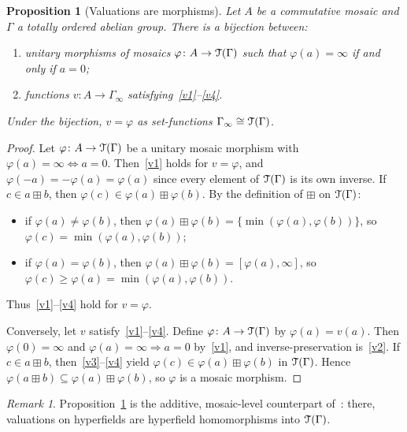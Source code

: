 \documentclass[11pt]{amsart}
\theoremstyle{plain}
\newtheorem{proposition}[theorem]{Proposition}
\theoremstyle{definition}
\theoremstyle{remark}
\newtheorem{remark}[theorem]{Remark}
\newcommand{\T}{\EuScript{T}}
\begin{document}
\begin{proposition}[Valuations are morphisms]
\label{prop:val-as-hom}
Let \(A\) be a commutative mosaic and \(\Gamma\) a totally ordered abelian group. There is a bijection between:
\begin{enumerate}[label=(\alph*)]
\item unitary morphisms of mosaics \(\varphi\colon A\to\T(\Gamma)\) such that \(\varphi(a)=\infty\) if and only if \(a=0\);
\item functions \(v\colon A\to\Gamma_\infty\) satisfying~\eqref{v1}--\eqref{v4}.
\end{enumerate}
Under the bijection, \(v=\varphi\) as set-functions \(\Gamma_\infty\cong\T(\Gamma)\).
\end{proposition}

\begin{proof}
Let \(\varphi\colon A\to\T(\Gamma)\) be a unitary mosaic morphism with \(\varphi(a)=\infty\Leftrightarrow a=0\). Then~\eqref{v1} holds for \(v=\varphi\), and \(\varphi(-a)=-\varphi(a)=\varphi(a)\) since every element of \(\T(\Gamma)\) is its own inverse. If \(c\in a\boxplus b\), then \(\varphi(c)\in\varphi(a)\boxplus\varphi(b)\). By the definition of \(\boxplus\) on \(\T(\Gamma)\):
\begin{itemize}
\item if \(\varphi(a)\neq\varphi(b)\), then \(\varphi(a)\boxplus\varphi(b)=\{\min(\varphi(a),\varphi(b))\}\), so \(\varphi(c)=\min(\varphi(a),\varphi(b))\);
\item if \(\varphi(a)=\varphi(b)\), then \(\varphi(a)\boxplus\varphi(b)=[\varphi(a),\infty]\), so \(\varphi(c)\ge\varphi(a)=\min(\varphi(a),\varphi(b))\).
\end{itemize}
Thus~\eqref{v1}--\eqref{v4} hold for \(v=\varphi\).

Conversely, let \(v\) satisfy~\eqref{v1}--\eqref{v4}. Define \(\varphi\colon A\to\T(\Gamma)\) by \(\varphi(a)=v(a)\). Then \(\varphi(0)=\infty\) and \(\varphi(a)=\infty\Rightarrow a=0\) by~\eqref{v1}, and inverse-preservation is~\eqref{v2}. If \(c\in a\boxplus b\), then~\eqref{v3}--\eqref{v4} yield \(\varphi(c)\in\varphi(a)\boxplus\varphi(b)\) in \(\T(\Gamma)\). Hence \(\varphi(a\boxplus b)\subseteq\varphi(a)\boxplus\varphi(b)\), so \(\varphi\) is a mosaic morphism.
\end{proof}

\begin{remark}
\label{rem:val-linzi}
Proposition~\ref{prop:val-as-hom} is the additive, mosaic-level counterpart of~\cite[Lemma~3.4]{Lin23compl}: there, valuations on hyperfields are hyperfield homomorphisms into \(\T(\Gamma)\).\end{remark}
\end{document}

